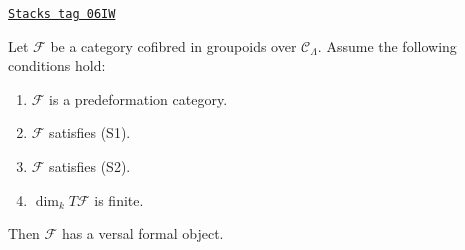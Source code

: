 \begin{lemma}
\label{formal-defos-lemma-versal-object-existence}
\href{https://stacks.math.columbia.edu/tag/06IW}{\texttt{Stacks tag 06IW}}

Let $\mathcal{F}$ be a category cofibred in groupoids over
$\mathcal{C}_\Lambda$. Assume the following conditions hold:
\begin{enumerate}
\item $\mathcal{F}$ is a predeformation category.
\item $\mathcal{F}$ satisfies (S1).
\item $\mathcal{F}$ satisfies (S2).
\item $\dim_k T\mathcal{F}$ is finite.
\end{enumerate}
Then $\mathcal{F}$ has a versal formal object.
\end{lemma}

